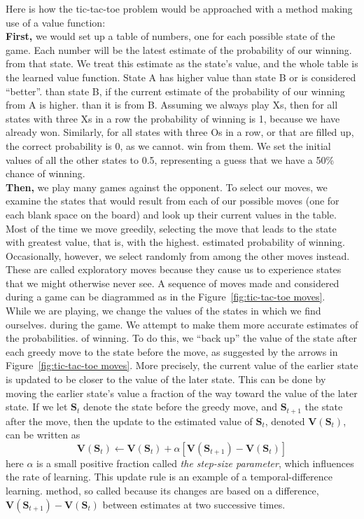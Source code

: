 Here is how the tic-tac-toe problem would be approached with a method making use of a value function: \\
\textbf{First,} we would set up a table of numbers, one for each possible state
of the game. Each number will be the latest estimate of the probability of our winning.
from that state. We treat this estimate as the state's value, and the whole table is the
learned value function. State A has higher value than state B or is considered “better”.
than state B, if the current estimate of the probability of our winning from A is higher.
than it is from B. Assuming we always play Xs, then for all states with three Xs in a row
the probability of winning is 1, because we have already won. Similarly, for all states
with three Os in a row, or that are filled up, the correct probability is 0, as we cannot.
win from them. We set the initial values of all the other states to 0.5, representing a
guess that we have a 50\% chance of winning. \\
\textbf{Then,} we play many games against the opponent. To select our moves, we examine the 
states that would result from each of our possible moves (one for each blank space on the
board) and look up their current values in the table. Most of the time we move greedily,
selecting the move that leads to the state with greatest value, that is, with the highest. estimated probability of winning. Occasionally, however, we select randomly from among
the other moves instead. These are called exploratory moves because they cause us to
experience states that we might otherwise never see. A sequence of moves made and
considered during a game can be diagrammed as in the Figure~\ref{fig:tic-tac-toe moves}. \\
While we are playing, we change the values of the states in which we find ourselves.
during the game. We attempt to make them more accurate estimates of the probabilities.
of winning. To do this, we “back up” the value of the state after each greedy move to
the state before the move, as suggested by the arrows in Figure~\ref{fig:tic-tac-toe moves}. More precisely, the
current value of the earlier state is updated to be closer to the value of the later state.
This can be done by moving the earlier state's value a fraction of the way toward the
value of the later state. If we let $\mathbf{S}_t$ denote the state before the greedy move, and $\mathbf{S}_{t + 1}$
the state after the move, then the update to the estimated value of $\mathbf{S}_t$, denoted $\mathbf{V}\left(\mathbf{S}_t\right)$,
can be written as
\[ \mathbf{V}\left( \mathbf{S}_t \right) \leftarrow \mathbf{V}\left( \mathbf{S}_t \right) + \alpha \left[ \mathbf{V}\left( \mathbf{S}_{t+1} \right) - \mathbf{V}\left( \mathbf{S}_t \right) \right] \]
here $\alpha$ is a small positive fraction called \emph{the step-size parameter}, which influences 
the rate of learning. This update rule is an example of a temporal-difference learning.
method, so called because its changes are based on a difference, $\mathbf{V}\left( \mathbf{S}_{t+1} \right) - \mathbf{V}\left( \mathbf{S}_t \right)$ between
estimates at two successive times.

